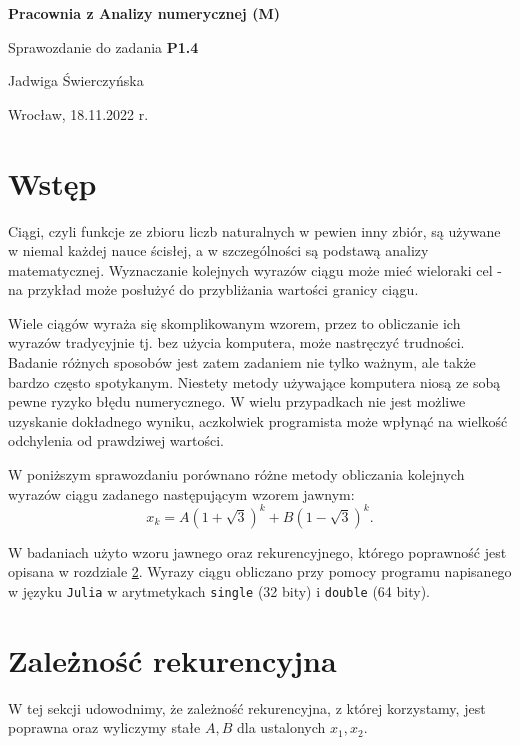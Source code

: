 \documentclass{article}
\begin{document}
\begin{center}
    \LARGE
    \textbf{Pracownia z Analizy numerycznej (M)}

    \medskip

    Sprawozdanie do zadania {\bf P1.4}
    

    \bigskip

    {\Large Jadwiga Świerczyńska}
    
    {\Large Wrocław, 18.11.2022 r.}
    
\end{center}

\vspace{70pt}

\section{Wstęp}

Ciągi, czyli funkcje ze zbioru liczb naturalnych w pewien inny zbiór, są używane w niemal każdej nauce ścisłej, a w szczególności są podstawą analizy matematycznej. Wyznaczanie kolejnych wyrazów ciągu może mieć wieloraki cel - na przykład może posłużyć do przybliżania wartości granicy ciągu.

Wiele ciągów wyraża się skomplikowanym wzorem, przez to obliczanie ich wyrazów tradycyjnie tj. bez użycia komputera, może nastręczyć trudności. Badanie różnych sposobów jest zatem zadaniem nie tylko ważnym, ale także bardzo często spotykanym. Niestety metody używające komputera niosą ze sobą pewne ryzyko błędu numerycznego. W wielu przypadkach nie jest możliwe uzyskanie dokładnego wyniku, aczkolwiek programista może wpłynąć na wielkość odchylenia od prawdziwej wartości.

W poniższym sprawozdaniu porównano różne metody obliczania kolejnych wyrazów ciągu zadanego następującym wzorem jawnym:
\begin{equation}\tag{WJaw}
    \label{wzor_jaw}
    x_k = A(1+\sqrt{3})^k + B(1-\sqrt{3})^k \text{.}
\end{equation}

W badaniach użyto wzoru jawnego oraz rekurencyjnego, którego poprawność jest opisana w rozdziale \ref{rek}. Wyrazy ciągu obliczano przy pomocy programu napisanego w języku \verb|Julia| w arytmetykach \verb|single| (32 bity)  i \verb|double| (64 bity).

\newpage

\section{Zależność rekurencyjna}
\label{rek}
W tej sekcji udowodnimy, że zależność rekurencyjna, z której korzystamy, jest poprawna oraz wyliczymy stałe \(A, B\) dla ustalonych \(x_1, x_2\).
\end{document}
